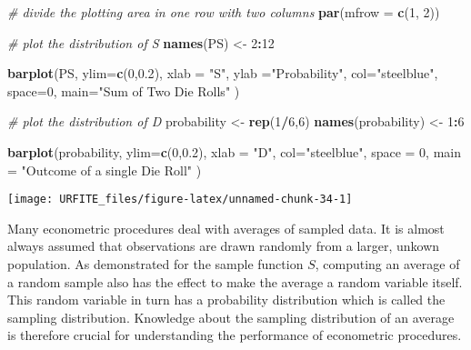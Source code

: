 \documentclass[]{book}
\newenvironment{Shaded}{\begin{snugshade}}{\end{snugshade}}
\newcommand{\KeywordTok}[1]{\textcolor[rgb]{0.13,0.29,0.53}{\textbf{#1}}}
\newcommand{\DataTypeTok}[1]{\textcolor[rgb]{0.13,0.29,0.53}{#1}}
\newcommand{\DecValTok}[1]{\textcolor[rgb]{0.00,0.00,0.81}{#1}}
\newcommand{\FloatTok}[1]{\textcolor[rgb]{0.00,0.00,0.81}{#1}}
\newcommand{\StringTok}[1]{\textcolor[rgb]{0.31,0.60,0.02}{#1}}
\newcommand{\CommentTok}[1]{\textcolor[rgb]{0.56,0.35,0.01}{\textit{#1}}}
\newcommand{\OperatorTok}[1]{\textcolor[rgb]{0.81,0.36,0.00}{\textbf{#1}}}
\newcommand{\NormalTok}[1]{#1}
\theoremstyle{definition}
\theoremstyle{definition}
\theoremstyle{definition}
\theoremstyle{remark}
\begin{document}
\begin{Shaded}
\begin{Highlighting}[]
\CommentTok{# divide the plotting area in one row with two columns}
\KeywordTok{par}\NormalTok{(}\DataTypeTok{mfrow =} \KeywordTok{c}\NormalTok{(}\DecValTok{1}\NormalTok{, }\DecValTok{2}\NormalTok{))}

\CommentTok{# plot the distribution of S}
\KeywordTok{names}\NormalTok{(PS) <-}\StringTok{ }\DecValTok{2}\OperatorTok{:}\DecValTok{12}

\KeywordTok{barplot}\NormalTok{(PS, }\DataTypeTok{ylim=}\KeywordTok{c}\NormalTok{(}\DecValTok{0}\NormalTok{,}\FloatTok{0.2}\NormalTok{), }
        \DataTypeTok{xlab =} \StringTok{"S"}\NormalTok{, }
        \DataTypeTok{ylab =}\StringTok{"Probability"}\NormalTok{, }
        \DataTypeTok{col=}\StringTok{"steelblue"}\NormalTok{, }
        \DataTypeTok{space=}\DecValTok{0}\NormalTok{, }
        \DataTypeTok{main=}\StringTok{"Sum of Two Die Rolls"}
\NormalTok{        )}

\CommentTok{# plot the distribution of D }
\NormalTok{probability <-}\StringTok{ }\KeywordTok{rep}\NormalTok{(}\DecValTok{1}\OperatorTok{/}\DecValTok{6}\NormalTok{,}\DecValTok{6}\NormalTok{)}
\KeywordTok{names}\NormalTok{(probability) <-}\StringTok{ }\DecValTok{1}\OperatorTok{:}\DecValTok{6}

\KeywordTok{barplot}\NormalTok{(probability, }
        \DataTypeTok{ylim=}\KeywordTok{c}\NormalTok{(}\DecValTok{0}\NormalTok{,}\FloatTok{0.2}\NormalTok{), }
        \DataTypeTok{xlab =} \StringTok{"D"}\NormalTok{, }
        \DataTypeTok{col=}\StringTok{"steelblue"}\NormalTok{, }
        \DataTypeTok{space =} \DecValTok{0}\NormalTok{, }
        \DataTypeTok{main =} \StringTok{"Outcome of a single Die Roll"}
\NormalTok{        )}
\end{Highlighting}
\end{Shaded}

\begin{center}\texttt{[image: URFITE\_files/figure-latex/unnamed-chunk-34-1]} \end{center}

Many econometric procedures deal with averages of sampled data. It is
almost always assumed that observations are drawn randomly from a
larger, unkown population. As demonstrated for the sample function
\(S\), computing an average of a random sample also has the effect to
make the average a random variable itself. This random variable in turn
has a probability distribution which is called the sampling
distribution. Knowledge about the sampling distribution of an average is
therefore crucial for understanding the performance of econometric
procedures.
\end{document}

